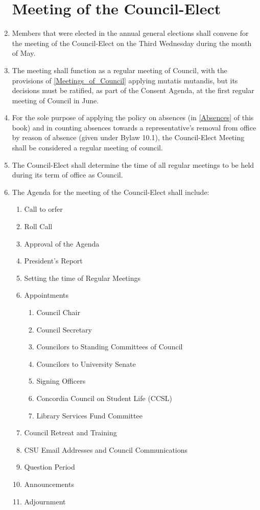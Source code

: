 \documentclass[oneside]{book}
\begin{document}
\begin{enumerate}
\chapter{\label{Meeting_of_the_Council-Elect}Meeting of the Council-Elect }
\item Members that were elected in the annual general elections shall convene for the meeting of the Council-Elect on the Third Wednesday during the month of May. 
\item The meeting shall function as a regular meeting of Council, with the provisions of \autoref{Meetings_of_Council} applying mutatis mutandis, but its decisions must be ratified, as part of the Consent Agenda, at the first regular meeting of Council in June.
\item For the sole purpose of applying the policy on absences (in \autoref{Absences} of this book) and in counting absences towards a representative's removal from office by reason of absence (given under Bylaw 10.1), the Council-Elect Meeting shall be considered a regular meeting of council.
\item The Council-Elect shall determine the time of all regular meetings
to be held during its term of office as Council. 


\item The Agenda for the meeting of the Council-Elect shall include:
\begin{enumerate}
\item Call to orfer
\item Roll Call
\item Approval of the Agenda
\item President's Report
\item Setting the time of Regular Meetings
\item Appointments
\begin{enumerate}
\item Council Chair
\item Council Secretary
\item Councilors to Standing Committees of Council
\item Councilors to University Senate
\item Signing Officers
\item Concordia Council on Student Life (CCSL)
\item Library Services Fund Committee
\end{enumerate}
\item Council Retreat and Training
\item CSU Email Addresses and Council Communications
\item Question Period
\item Announcements
\item Adjournment
\end{enumerate}


\end{enumerate}
\end{document}
